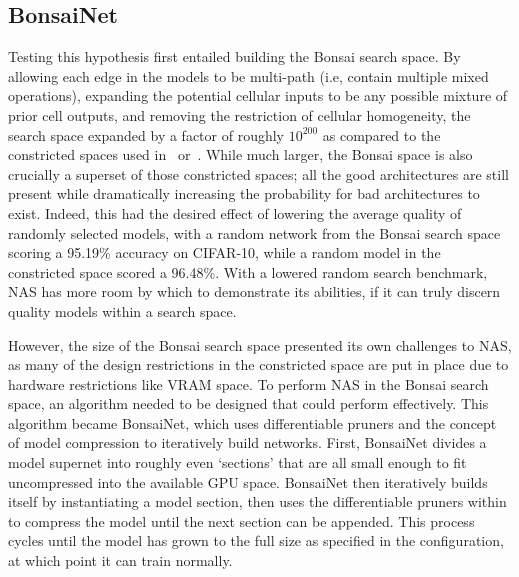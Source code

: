 \subsection{BonsaiNet}
Testing this hypothesis first entailed building the Bonsai search space. By allowing each edge in the models to be
multi-path (i.e, contain multiple mixed operations), expanding the potential cellular inputs to be any possible mixture of
prior cell outputs, and removing the restriction of cellular homogeneity, the search space expanded by a factor of
roughly $10^{200}$ as compared to the constricted spaces used in~\cite{li2019} or~\cite{yu2019}. While
much larger, the Bonsai space is also crucially a superset of those constricted spaces; all the good architectures
are still present while dramatically increasing the probability for bad architectures to exist. Indeed, this had the desired
effect of lowering the average quality of randomly selected models, with a random network from the Bonsai search space
scoring a 95.19\% accuracy on CIFAR-10, while a random model in the constricted space scored a 96.48\%. With a lowered
random search benchmark, NAS has more room by which to demonstrate its abilities, if it can truly discern quality models
within a search space.

However, the size of the Bonsai search space presented its own challenges to NAS, as many of the design restrictions
in the constricted space are put in place due to hardware restrictions like VRAM space. To perform NAS in the Bonsai search
space, an algorithm needed to be designed that could perform effectively. This algorithm became BonsaiNet, which
uses differentiable pruners and the concept of model compression to iteratively build networks. First, BonsaiNet
divides a model supernet into roughly even `sections' that are all small enough to fit uncompressed into the available
GPU space. BonsaiNet then iteratively builds itself by instantiating a model section, then uses the differentiable pruners
within to compress the model until the next section can be appended. This process cycles until the model has grown to the
full size as specified in the configuration, at which point it can train normally.

